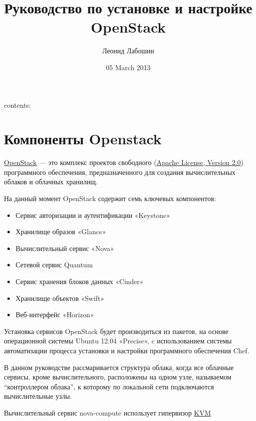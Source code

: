 \documentclass[letterpaper,10pt,russian]{sphinxmanual}
\title{Руководство по установке и настройке OpenStack}
\date{05 March 2013}
\author{Леонид Лабошин}
\begin{document}
\maketitle
\tableofcontents
{}\label{index::doc}


contents:


\chapter{Компоненты Openstack}
\label{index:openstack}\label{index:openstack-folsom}
\href{http://www.openstack.org/}{OpenStack} — это комплекс проектов свободного (\href{http://www.apache.org/licenses/LICENSE-2.0}{Apache License, Version 2.0}) программного обеспечения, предназначенного для создания вычислительных облаков и облачных хранилищ.

На данный момент OpenStack содержит семь ключевых компонентов:
\begin{itemize}
\item {} 
Сервис авторизации и аутентификации «Keystone»

\item {} 
Хранилище образов «Glance»

\item {} 
Вычислительный сервис «Nova»

\item {} 
Сетевой сервис Quantum

\item {} 
Сервис хранения блоков данных «Cinder»

\item {} 
Хранилище объектов «Swift»

\item {} 
Веб-интерфейс «Horizon»

\end{itemize}

Установка сервисов OpenStack будет производиться из пакетов, на основе операционной системы Ubuntu 12.04 «Precise», c использованием системы автоматизации процесса установки и настройки программного обеспечения Chef.

В данном руководстве рассмаривается структура облака, когда все облачные сервисы, кроме вычислительного, расположены на одном узле, называемом ``контроллером облака'', к которому по локальной сети подключаются вычислительные узлы.

Вычислительный сервис nova-compute использует гипервизор \href{http://www.linux-kvm.org/page/Main\_Page}{KVM}
\end{document}

